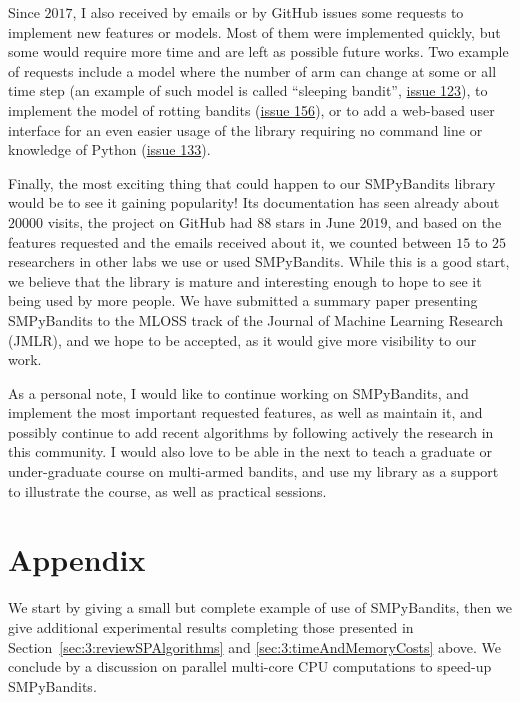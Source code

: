 Since $2017$, I also received by emails or by GitHub issues some requests to implement new features or models. Most of them were implemented quickly, but some would require more time and are left as possible future works.
Two example of requests include a model where the number of arm can change at some or all time step (an example of such model is called ``sleeping bandit'', \href{https://github.com/SMPyBandits/SMPyBandits/issues/123}{issue 123}), to implement the model of rotting bandits (\href{https://github.com/SMPyBandits/SMPyBandits/issues/156}{issue 156}), or to add a web-based user interface for an even easier usage of the library requiring no command line or knowledge of Python (\href{https://github.com/SMPyBandits/SMPyBandits/issues/133}{issue 133}).


Finally, the most exciting thing that could happen to our SMPyBandits library would be to see it gaining popularity!
Its documentation has seen already about $20000$ visits, the project on GitHub had $88$ stars in June $2019$, and based on the features requested and the emails received about it, we counted between $15$ to $25$ researchers in other labs we use or used SMPyBandits.
While this is a good start, we believe that the library is mature and interesting enough to hope to see it being used by more people.
%
We have submitted a summary paper presenting SMPyBandits \cite{SMPyBanditsJMLR} to the MLOSS track of the Journal of Machine Learning Research (JMLR), and we hope to be accepted, as it would give more visibility to our work.

As a personal note, I would like to continue working on SMPyBandits, and implement the most important requested features, as well as maintain it, and possibly continue to add recent algorithms by following actively the research in this community.
I would also love to be able in the next to teach a graduate or under-graduate course on multi-armed bandits, and use my library as a support to illustrate the course, as well as practical sessions.


\newpage  %
\section{Appendix}
\label{sec:3:appendix}

We start by giving a small but complete example of use of SMPyBandits, then we give additional experimental results completing those presented in Section~\ref{sec:3:reviewSPAlgorithms} and \ref{sec:3:timeAndMemoryCosts} above.
We conclude by a discussion on parallel multi-core CPU computations to speed-up SMPyBandits.


